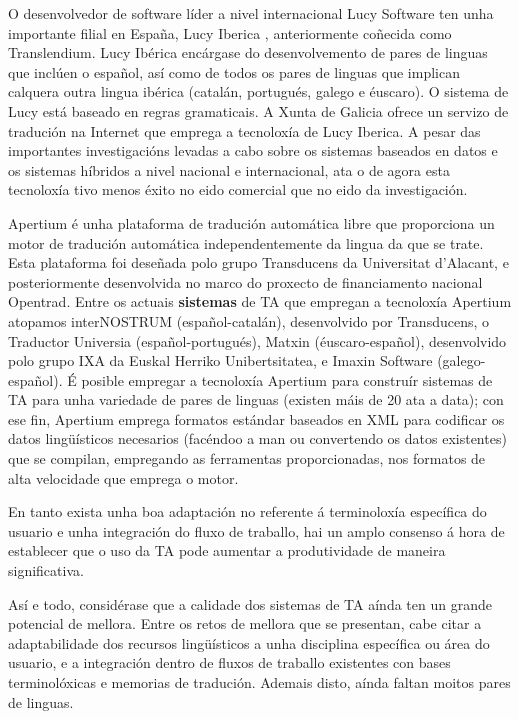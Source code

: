 \begin{multicols}{2}
O desenvolvedor de software líder a nivel internacional Lucy Software ten unha importante filial en España, Lucy Iberica \cite{GAL-Nota31}, anteriormente coñecida como Translendium. Lucy Ibérica encárgase do desenvolvemento de pares de linguas que inclúen o español, así como de todos os pares de linguas que implican calquera outra lingua ibérica (catalán, portugués, galego e éuscaro). O sistema de Lucy está baseado en regras gramaticais. A Xunta de Galicia \cite{GAL-Nota32} ofrece un servizo de tradución na Internet que emprega a tecnoloxía de Lucy Iberica. A pesar das importantes investigacións levadas a cabo sobre os sistemas baseados en datos e os sistemas híbridos a nivel nacional e internacional, ata o de agora esta tecnoloxía tivo menos éxito no eido comercial que no eido da investigación.

Apertium é unha plataforma de tradución automática libre que proporciona un motor de tradución automática independentemente da lingua da que se trate. Esta plataforma foi deseñada polo grupo Transducens da Universitat d'Alacant, e posteriormente desenvolvida no marco do proxecto de financiamento nacional Opentrad. Entre os actuais \textbf{sistemas} de TA que empregan a tecnoloxía Apertium atopamos interNOSTRUM (español-catalán), desenvolvido por Transducens, o Traductor Universia (español-portugués), Matxin (éuscaro-español), desenvolvido polo grupo IXA \cite{GAL-Nota33} da Euskal Herriko Unibertsitatea, e Imaxin Software (galego-español). É posible empregar a tecnoloxía Apertium para construír sistemas de TA para unha variedade de pares de linguas (existen máis de 20 ata a data); con ese fin, Apertium emprega formatos estándar baseados en XML para codificar os datos lingüísticos necesarios (facéndoo a man ou convertendo os datos existentes) que se compilan, empregando as ferramentas proporcionadas, nos formatos de alta velocidade que emprega o motor. 

En tanto exista unha boa adaptación no referente á terminoloxía específica do usuario e unha integración do fluxo de traballo, hai un amplo consenso á hora de establecer que o uso da TA pode aumentar a produtividade de maneira significativa. 

Así e todo, considérase que a calidade dos sistemas de TA aínda ten un grande potencial de mellora. Entre os retos de mellora que se presentan, cabe citar a adaptabilidade dos recursos lingüísticos a unha disciplina específica ou área do usuario, e a integración dentro de fluxos de traballo existentes con bases terminolóxicas e memorias de tradución. Ademais disto, aínda faltan moitos pares de linguas. 



\end{multicols}
